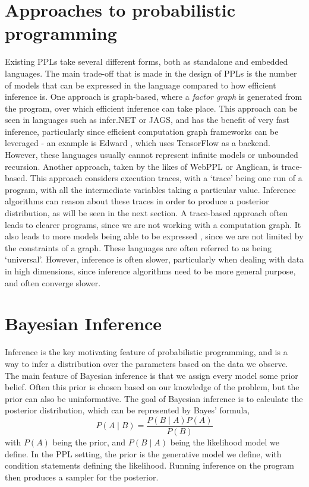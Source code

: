 \section{Approaches to probabilistic programming}
Existing PPLs take several different forms, both as standalone and embedded languages. The main trade-off that is made in the design of PPLs is the number of models that can be expressed in the language compared to how efficient inference is. One approach is graph-based, where a \textit{factor graph} is generated from the program, over which efficient inference can take place. This approach can be seen in languages such as infer.NET or JAGS, and has the benefit of very fast inference, particularly since efficient computation graph frameworks can be leveraged - an example is Edward \cite{edward}, which uses TensorFlow as a backend. However, these languages usually cannot represent infinite models or unbounded recursion. Another approach, taken by the likes of WebPPL or Anglican, is trace-based. This approach considers execution traces, with a `trace' being one run of a program, with all the intermediate variables taking a particular value. Inference algorithms can reason about these traces in order to produce a posterior distribution, as will be seen in the next section. A trace-based approach often leads to clearer programs, since we are not working with a computation graph. It also leads to more models being able to be expressed , since we are not limited by the constraints of a graph. These languages are often referred to as being `universal'. However, inference is often slower, particularly when dealing with data in high dimensions, since inference algorithms need to be more general purpose, and often converge slower.
	
\section{Bayesian Inference}
Inference is the key motivating feature of probabilistic programming, and is a way to infer a distribution over the parameters based on the data we observe. The main feature of Bayesian inference is that we assign every model some prior belief. Often this prior is chosen based on our knowledge of the problem, but the prior can also be uninformative. The goal of Bayesian inference is to calculate the posterior distribution, which can be represented by Bayes' formula,
$$P(A\mid B)={\frac {P(B\mid A)P(A)}{P(B)}}$$
with $P(A)$ being the prior, and $P(B\mid A)$ being the likelihood model we define. In the PPL setting, the prior is the generative model we define, with condition statements defining the likelihood. Running inference on the program then produces a sampler for the posterior.


